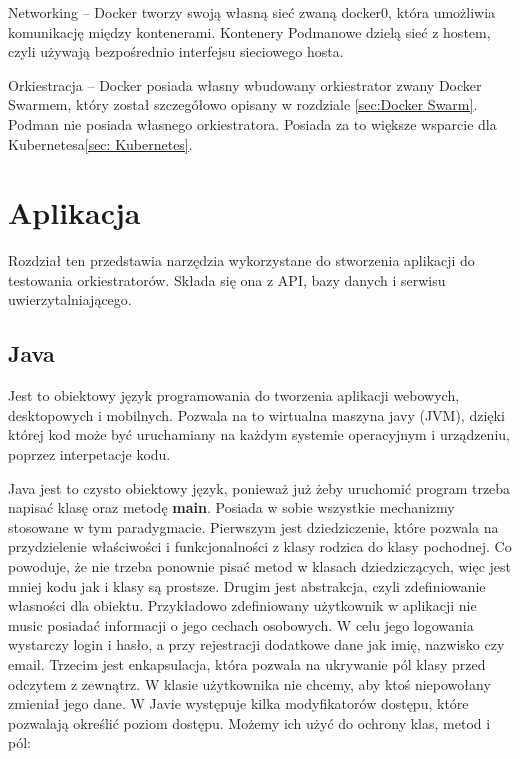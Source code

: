 \documentclass{iiuwb}
\begin{document}
Networking -- Docker tworzy swoją własną sieć zwaną docker0, która umożliwia komunikację między kontenerami. Kontenery Podmanowe dzielą sieć z hostem, czyli używają bezpośrednio interfejsu sieciowego hosta.
\newline

Orkiestracja -- Docker posiada własny wbudowany orkiestrator zwany Docker Swarmem, który został szczegółowo opisany w rozdziale \ref{sec:Docker Swarm}. Podman nie posiada własnego orkiestratora. Posiada za to większe wsparcie dla Kubernetesa\ref{sec: Kubernetes}.

\cleardoublepage
\chapter{Aplikacja}
\label{cha:Aplikacja}

Rozdział ten przedstawia narzędzia wykorzystane do stworzenia aplikacji do testowania orkiestratorów. Składa się ona z API, bazy danych i serwisu uwierzytalniającego. 

\section{Java}
\label{sec:Java}

Jest to obiektowy język programowania do tworzenia aplikacji webowych, desktopowych i mobilnych. Pozwala na to wirtualna maszyna javy (JVM), dzięki której kod może być uruchamiany na każdym systemie operacyjnym i urządzeniu, poprzez interpetacje kodu. 

Java jest to czysto obiektowy język, ponieważ już żeby uruchomić program trzeba napisać klasę oraz metodę \textbf{main}. Posiada w sobie wszystkie mechanizmy stosowane w tym paradygmacie. 
Pierwszym jest dziedziczenie, które pozwala na przydzielenie właściwości i funkcjonalności z klasy rodzica do klasy pochodnej. Co powoduje, że nie trzeba ponownie pisać metod w klasach dziedziczących, więc jest mniej kodu jak i klasy są prostsze. 
Drugim jest abstrakcja, czyli zdefiniowanie własności dla obiektu. Przykładowo zdefiniowany użytkownik w aplikacji nie music posiadać informacji o jego cechach osobowych. W celu jego logowania wystarczy login i hasło, a przy rejestracji dodatkowe dane jak imię, nazwisko czy email.
Trzecim jest enkapsulacja, która pozwala na ukrywanie pól klasy przed odczytem z zewnątrz. W klasie użytkownika nie chcemy, aby ktoś niepowołany zmieniał jego dane. W Javie występuje kilka modyfikatorów dostępu, które pozwalają określić poziom dostępu. Możemy ich użyć do ochrony klas, metod i pól:
\end{document}
